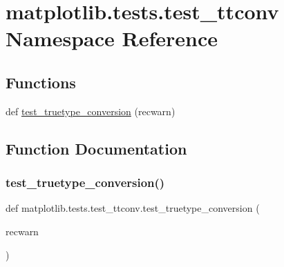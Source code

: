 \hypertarget{namespacematplotlib_1_1tests_1_1test__ttconv}{}\section{matplotlib.\+tests.\+test\+\_\+ttconv Namespace Reference}
\label{namespacematplotlib_1_1tests_1_1test__ttconv}
\subsection*{Functions}
\begin{DoxyCompactItemize}
\item 
def \hyperlink{namespacematplotlib_1_1tests_1_1test__ttconv_a8265ac0c555450f71a2df3f6974f1d75}{test\+\_\+truetype\+\_\+conversion} (recwarn)
\end{DoxyCompactItemize}


\subsection{Function Documentation}
\mbox{\label{namespacematplotlib_1_1tests_1_1test__ttconv_a8265ac0c555450f71a2df3f6974f1d75}} 
\subsubsection{\texorpdfstring{test\+\_\+truetype\+\_\+conversion()}{test\_truetype\_conversion()}}
{\footnotesize\ttfamily def matplotlib.\+tests.\+test\+\_\+ttconv.\+test\+\_\+truetype\+\_\+conversion (\begin{DoxyParamCaption}\item[{}]{recwarn }\end{DoxyParamCaption})}

